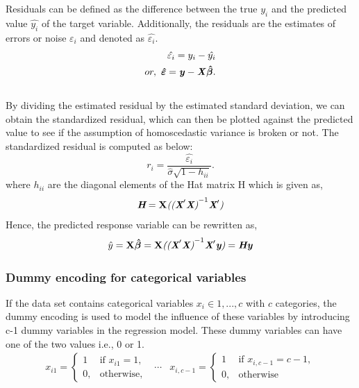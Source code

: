 \documentclass[12 pt]{scrartcl}
\begin{document}
Residuals can be defined as the difference between the true {\emph{${{y_i}}$}} and the predicted value {\emph{${\hat{y_i}}$}} of the target variable. Additionally, the residuals are the estimates of errors or noise ${\varepsilon_i}$ and denoted as ${\hat{\varepsilon_i}}$.	
\[
\begin{aligned}
{\hat{\varepsilon_i}} = {\emph{${{y_i}}$}} - {\emph{${\hat{y_i}}$}} \\
or,\,\, {\boldsymbol{\hat{\varepsilon}}} = {\textbf{\emph{y}}} - {\textbf{\emph{X}}}{\boldsymbol{\hat{\beta}}}.
\end{aligned}
\]\citep[p.~77]{regression}\\
By dividing the estimated residual by the estimated standard deviation, we can obtain the standardized residual, which can then be plotted against the predicted value to see if the assumption of homoscedastic variance is broken or not. The standardized residual is computed as below:
\[
{r_i} = \frac{\hat{\varepsilon_i}}{\hat{\sigma}{\sqrt{1-h_{ii}}}}.
\]
where $h_{ii}$ are the diagonal elements of the Hat matrix H which is given as,
\[
\emph{\textbf{H}} = {\textbf{X}} \emph{(}{\emph{({\textbf{X}}}'\emph{\textbf{X}}\emph{)}}^{-1} \emph{{\textbf{X}}}'\emph{)}
\]
Hence, the predicted response variable can be rewritten as,
\[
\emph{${\hat{y}}$} = {\textbf{X}}{\boldsymbol{\hat{\beta}}} = {\textbf{X}} \emph{(}{\emph{({\textbf{X}}}'\emph{\textbf{X}}\emph{)}}^{-1} \emph{{\textbf{X}}}'{\emph{{\textbf{y}}}}\emph{)}= \emph{\textbf{Hy}}
\]
\citep[p.~124,107]{regression}

\subsubsection{Dummy encoding for categorical variables}

If the data set contains categorical variables $x_i\in {1,...,c}$ with $c$ categories, the dummy encoding is used to model the influence of these variables by introducing c-1 dummy variables in the regression model. These dummy variables can have one of the two values i.e., 0 or 1.
\[
\begin{matrix}
{x_{i1} = 
\begin{cases}
1 & \text{if } x_{i1} = 1,\\
0, & \text{otherwise,}
\end{cases}} & {\cdots} &
{x_{i,c-1} = 
\begin{cases}
1 & \text{if } x_{i,c-1} = c - 1,\\
0, & \text{otherwise}
\end{cases}}
\end{matrix}
\] 
\end{document}
